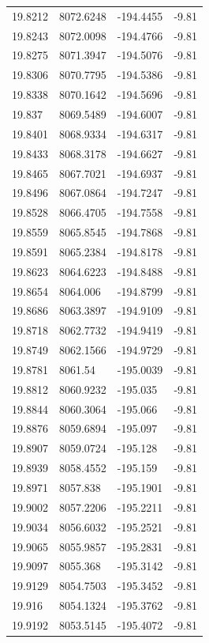 \begin{table}[H]
\begin{tabular}{llll}
19.8212 & 8072.6248 & -194.4455 & -9.81 \\
19.8243 & 8072.0098 & -194.4766 & -9.81 \\
19.8275 & 8071.3947 & -194.5076 & -9.81 \\
19.8306 & 8070.7795 & -194.5386 & -9.81 \\
19.8338 & 8070.1642 & -194.5696 & -9.81 \\
19.837 & 8069.5489 & -194.6007 & -9.81 \\
19.8401 & 8068.9334 & -194.6317 & -9.81 \\
19.8433 & 8068.3178 & -194.6627 & -9.81 \\
19.8465 & 8067.7021 & -194.6937 & -9.81 \\
19.8496 & 8067.0864 & -194.7247 & -9.81 \\
19.8528 & 8066.4705 & -194.7558 & -9.81 \\
19.8559 & 8065.8545 & -194.7868 & -9.81 \\
19.8591 & 8065.2384 & -194.8178 & -9.81 \\
19.8623 & 8064.6223 & -194.8488 & -9.81 \\
19.8654 & 8064.006 & -194.8799 & -9.81 \\
19.8686 & 8063.3897 & -194.9109 & -9.81 \\
19.8718 & 8062.7732 & -194.9419 & -9.81 \\
19.8749 & 8062.1566 & -194.9729 & -9.81 \\
19.8781 & 8061.54 & -195.0039 & -9.81 \\
19.8812 & 8060.9232 & -195.035 & -9.81 \\
19.8844 & 8060.3064 & -195.066 & -9.81 \\
19.8876 & 8059.6894 & -195.097 & -9.81 \\
19.8907 & 8059.0724 & -195.128 & -9.81 \\
19.8939 & 8058.4552 & -195.159 & -9.81 \\
19.8971 & 8057.838 & -195.1901 & -9.81 \\
19.9002 & 8057.2206 & -195.2211 & -9.81 \\
19.9034 & 8056.6032 & -195.2521 & -9.81 \\
19.9065 & 8055.9857 & -195.2831 & -9.81 \\
19.9097 & 8055.368 & -195.3142 & -9.81 \\
19.9129 & 8054.7503 & -195.3452 & -9.81 \\
19.916 & 8054.1324 & -195.3762 & -9.81 \\
19.9192 & 8053.5145 & -195.4072 & -9.81 \\

\end{tabular}
\end{table}
